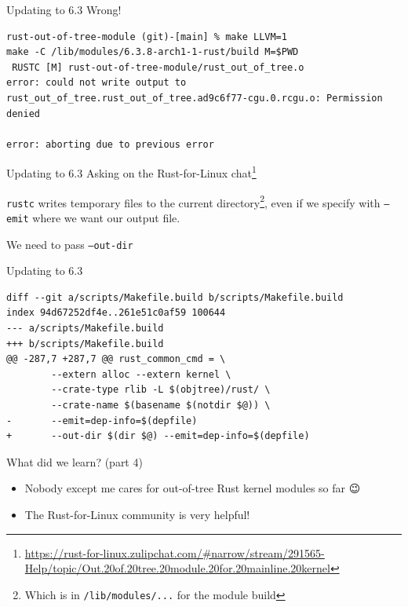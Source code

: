 \begin{frame}[c,fragile]{Updating to 6.3}
  Wrong!
\begin{verbatim}
rust-out-of-tree-module (git)-[main] % make LLVM=1
make -C /lib/modules/6.3.8-arch1-1-rust/build M=$PWD
 RUSTC [M] rust-out-of-tree-module/rust_out_of_tree.o
error: could not write output to rust_out_of_tree.rust_out_of_tree.ad9c6f77-cgu.0.rcgu.o: Permission denied

error: aborting due to previous error
\end{verbatim}
\end{frame}

\begin{frame}[c]{Updating to 6.3}
  Asking on the Rust-for-Linux
  chat\footnote{\url{https://rust-for-linux.zulipchat.com/\#narrow/stream/291565-Help/topic/Out.20of.20tree.20module.20for.20mainline.20kernel}}

  \texttt{rustc} writes temporary files to the current directory\footnote{Which is in \texttt{/lib/modules/...} for the module build}, even if we specify
  with \texttt{--emit} where we want our output file.

  We need to pass \texttt{--out-dir}
\end{frame}

\begin{frame}[c,fragile]{Updating to 6.3}
\begin{verbatim}
diff --git a/scripts/Makefile.build b/scripts/Makefile.build
index 94d67252df4e..261e51c0af59 100644
--- a/scripts/Makefile.build
+++ b/scripts/Makefile.build
@@ -287,7 +287,7 @@ rust_common_cmd = \
        --extern alloc --extern kernel \
        --crate-type rlib -L $(objtree)/rust/ \
        --crate-name $(basename $(notdir $@)) \
-       --emit=dep-info=$(depfile)
+       --out-dir $(dir $@) --emit=dep-info=$(depfile)
\end{verbatim}
\end{frame}

\begin{frame}[c]{What did we learn? (part 4)}
  \begin{itemize}
    \item Nobody except me cares for out-of-tree Rust kernel modules so far {\Emoji😉}
    \item The Rust-for-Linux community is very helpful!
      {\Emoji🎉}
  \end{itemize}
\end{frame}
